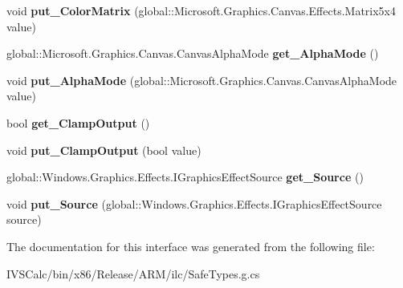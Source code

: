 \begin{DoxyCompactItemize}
void {\bfseries put\+\_\+\+Color\+Matrix} (global\+::\+Microsoft.\+Graphics.\+Canvas.\+Effects.\+Matrix5x4 value)
\item 
\mbox{\label{interface_microsoft_1_1_graphics_1_1_canvas_1_1_effects_1_1_i_color_matrix_effect_a38a2f04f4c349390c6709ea86049bb00}} 
global\+::\+Microsoft.\+Graphics.\+Canvas.\+Canvas\+Alpha\+Mode {\bfseries get\+\_\+\+Alpha\+Mode} ()
\item 
\mbox{\label{interface_microsoft_1_1_graphics_1_1_canvas_1_1_effects_1_1_i_color_matrix_effect_a19111c668130b4e202fdcf1b6370de85}} 
void {\bfseries put\+\_\+\+Alpha\+Mode} (global\+::\+Microsoft.\+Graphics.\+Canvas.\+Canvas\+Alpha\+Mode value)
\item 
\mbox{\label{interface_microsoft_1_1_graphics_1_1_canvas_1_1_effects_1_1_i_color_matrix_effect_a62eb1bdc351375bda377af3d39f4407d}} 
bool {\bfseries get\+\_\+\+Clamp\+Output} ()
\item 
\mbox{\label{interface_microsoft_1_1_graphics_1_1_canvas_1_1_effects_1_1_i_color_matrix_effect_ac0b84a9c8932bab90011df716de57abc}} 
void {\bfseries put\+\_\+\+Clamp\+Output} (bool value)
\item 
\mbox{\label{interface_microsoft_1_1_graphics_1_1_canvas_1_1_effects_1_1_i_color_matrix_effect_a92c8a46f383c29807747e76c7a9dab74}} 
global\+::\+Windows.\+Graphics.\+Effects.\+I\+Graphics\+Effect\+Source {\bfseries get\+\_\+\+Source} ()
\item 
\mbox{\label{interface_microsoft_1_1_graphics_1_1_canvas_1_1_effects_1_1_i_color_matrix_effect_ad452b45320bc870760daae883acd5030}} 
void {\bfseries put\+\_\+\+Source} (global\+::\+Windows.\+Graphics.\+Effects.\+I\+Graphics\+Effect\+Source source)
\end{DoxyCompactItemize}


The documentation for this interface was generated from the following file\+:\begin{DoxyCompactItemize}
\item 
I\+V\+S\+Calc/bin/x86/\+Release/\+A\+R\+M/ilc/Safe\+Types.\+g.\+cs\end{DoxyCompactItemize}
